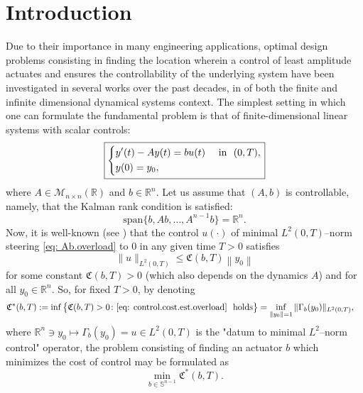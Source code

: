\documentclass[11pt, a4paper, reqno]{amsart}
\newcommand{\R}{\mathbb{R}}
\theoremstyle{plain}
\numberwithin{equation}{section}
\begin{document}
\section{Introduction}
Due to their importance in many engineering applications, optimal design problems consisting in finding the location wherein a control of least amplitude actuates and ensures the controllability of the underlying system have been investigated in several works over the past decades, in of both the finite and infinite dimensional dynamical systems context. 
The simplest setting in which one can formulate the fundamental problem is that of finite-dimensional linear systems with scalar controls:
	\begin{equation} \label{eq: Ab.overload}
	\boxed{
	\begin{dcases}
	y'(t) - Ay(t) = bu(t) &\text{ in } (0,T), \\
	y(0) = y_0,
	\end{dcases}
	}
	\end{equation}
	where $A\in\mathcal{M}_{n\times n}(\R)$ and $b\in\R^{n}$. 
	Let us assume that $(A, b)$ is controllable, namely, that the Kalman rank condition is satisfied:
	\begin{equation} \label{eq: kalman.rank.condition}
	\text{span}\big\{b,Ab, \ldots, A^{n-1}b\big\} = \R^n.
	\end{equation}
	Now, it is well-known (see \citep{zuazua2007controllability}) that the control $u(\cdot)$ of minimal $L^2(0,T)$--norm steering \eqref{eq: Ab.overload} to $0$ in any given time $T>0$ satisfies
	\begin{equation} \label{eq: control.cost.est.overload}
	\|u\|_{L^2(0,T)} \leqslant \mathfrak{C}(b,T) \left\|y_0\right\|
	\end{equation}
	for some constant $\mathfrak{C}(b,T)>0$ (which also depends on the dynamics $A$) and for all $y_0\in\R^n$. So, for fixed $T>0$, by denoting
	\begin{align*}
	\mathfrak{C}^*(b,T) &:= \inf\big\{\mathfrak{C}(b,T)>0 \colon \eqref{eq: control.cost.est.overload} \text{ holds}\big\} = \inf_{\|y_0\|=1} \|\Gamma_b(y_0)\|_{L^2(0,T)},
	\end{align*}
	where $\R^n\ni y_0\mapsto\Gamma_b(y_0) = u\in L^2(0,T)$ is the "datum to minimal $L^2$--norm control" operator, the problem consisting of finding an actuator $b$ which minimizes the cost of control may be formulated as 
	\begin{equation} \label{eq: inf.control.cost.b}
	\boxed{
	\min_{b\in\mathbb{S}^{n-1}} \mathfrak{C}^*(b,T).
	}
	\end{equation}	
\end{document}
